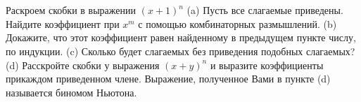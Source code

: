 \documentclass{article}%
\begin{document}
%
\section{}%
\label{sec:}%
Раскроем скобки в выражении $(x + 1)^n$
(a) Пусть все слагаемые приведены. Найдите коэффициент при $x^m$ с помощью комбинаторных размышлений.
(b) Докажите, что этот коэффициент равен найденному в предыдущем пункте числу, по индукции.
(c) Сколько будет слагаемых без приведения подобных слагаемых?
(d) Расскройте скобки у выражения $(x + y)^n$ и выразите коэффициенты прикаждом приведенном члене.
Выражение, полученное Вами в пункте (d) называется биномом Ньютона.%
%
\iffalse%
Автор: Павел Минаев%
Дата: 07{-}10{-}2017%
Название: None%
Подсказка: \textbackslash{}\textbackslash{}%
nan%
\fi

%
\end{document}

